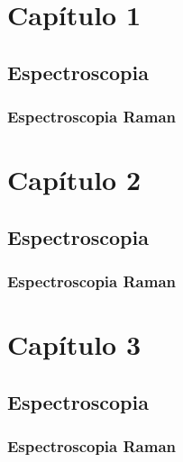 \documentclass[11pt, twoside]{book}
\begin{document}
	\chapter{Capítulo 1}
 	\section{Espectroscopia}
	\subsection{Espectroscopia Raman}
	\chapter{Capítulo 2}
 	\section{Espectroscopia}
	\subsection{Espectroscopia Raman}
 	\chapter{Capítulo 3}
 	\section{Espectroscopia}
	\subsection{Espectroscopia Raman}
\end{document}
